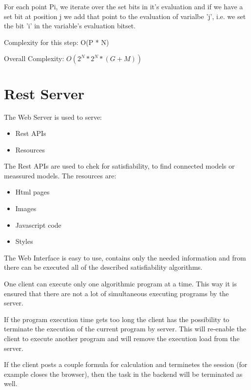 \documentclass{article}
\begin{document}
				For each point Pi, we iterate over the set bits in it's evaluation and 
				if we have a set bit at position j we add that point to the evaluation 
				of varialbe 'j', i.e. we set the bit 'i' in the variable's evaluation bitset.
				\newline

				Complexity for this step: O(P * N)
				\newline
				\newline

				Overall Complexity: $O(2^N * 2^N * (G+M))$

	\newpage
	\section{Rest Server}
		The Web Server is used to serve:
		\begin{itemize}
			\item Rest APIs
			\item Resources
		\end{itemize}
		The Rest APIs are used to chek for satisfiability, to find connected models or meassured models.
		\newline
		The resources are:
		\begin{itemize}
			\item Html pages
			\item Images 
			\item Javascript code
			\item Styles
		\end{itemize}
		The Web Interface is easy to use, contains only the needed information and from there 
		can be executed all of the described satisfiability algorithms.

		One client can execute only one algorithmic program at a time. 
		This way it is ensured that there are not a lot of simultaneous executing programs by the server.
		
		If the program execution time gets too long the client has the possibility to terminate the execution 
		of the current program by server. This will re-enable the client to execute another program and will remove 
		the execution load from the server.

		If the client posts a couple formula for calculation and terminetes the session (for example closes the browser),
		then the task in the backend will be terminated as well.
\end{document}
